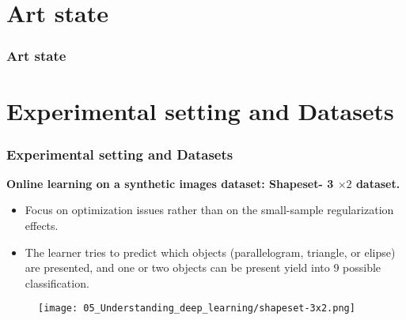 \section{Art state}

\begin{frame}
  \frametitle{Art state}

\end{frame}

\section{Experimental setting and Datasets}
\begin{frame}
  \frametitle{Experimental setting and Datasets}
   \textbf{Online learning on a synthetic images dataset: \textbf{Shapeset- 3} $\times 2$ dataset.}
  \begin{itemize}
    \item Focus on optimization issues rather than on the small-sample regularization effects.
    \item  The learner tries to predict which objects (parallelogram, triangle, or elipse) are presented, and one or two objects can be present yield into 9 possible classification.  
  \end{itemize}

  \begin{figure}[t]
    \texttt{[image: 05\_Understanding\_deep\_learning/shapeset-3x2.png]}
    \centering
\end{figure}

\end{frame}

